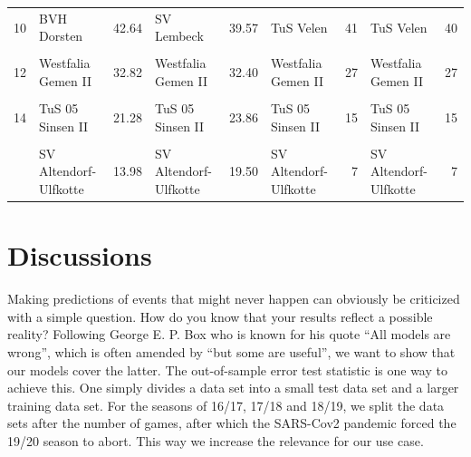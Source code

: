 \documentclass[12pt,a4paper]{article}
\begin{document}
\begin{table}[H]
{\begin{tabular}[t]{rlrlrlrlr}
10 & BVH Dorsten & 42.64 & SV Lembeck & 39.57 & TuS Velen & 41 & TuS Velen & 40\\
\addlinespace
\cellcolor{gray!6}{11} & \cellcolor{gray!6}{FC RW Dorsten} & \cellcolor{gray!6}{37.59} & \cellcolor{gray!6}{FC RW Dorsten} & \cellcolor{gray!6}{35.82} & \cellcolor{gray!6}{FC RW Dorsten} & \cellcolor{gray!6}{28} & \cellcolor{gray!6}{FC RW Dorsten} & \cellcolor{gray!6}{28}\\
12 & Westfalia Gemen II & 32.82 & Westfalia Gemen II & 32.40 & Westfalia Gemen II & 27 & Westfalia Gemen II & 27\\
\cellcolor{gray!6}{13} & \cellcolor{gray!6}{SC Reken II} & \cellcolor{gray!6}{27.60} & \cellcolor{gray!6}{SC Reken II} & \cellcolor{gray!6}{29.11} & \cellcolor{gray!6}{SC Reken II} & \cellcolor{gray!6}{25} & \cellcolor{gray!6}{SC Reken II} & \cellcolor{gray!6}{25}\\
14 & TuS 05 Sinsen II & 21.28 & TuS 05 Sinsen II & 23.86 & TuS 05 Sinsen II & 15 & TuS 05 Sinsen II & 15\\
\cellcolor{gray!6}{15} & \cellcolor{gray!6}{Adler Weseke II} & \cellcolor{gray!6}{18.88} & \cellcolor{gray!6}{Adler Weseke II} & \cellcolor{gray!6}{22.60} & \cellcolor{gray!6}{Adler Weseke II} & \cellcolor{gray!6}{15} & \cellcolor{gray!6}{Adler Weseke II} & \cellcolor{gray!6}{15}\\
\addlinespace
16 & SV Altendorf-Ulfkotte & 13.98 & SV Altendorf-Ulfkotte & 19.50 & SV Altendorf-Ulfkotte & 7 & SV Altendorf-Ulfkotte & 7\\
\bottomrule
\end{tabular}}
\end{table}

\hypertarget{discussions}{%
\section{Discussions}\label{discussions}}

Making predictions of events that might never happen can obviously be
criticized with a simple question. How do you know that your results
reflect a possible reality? Following George E. P. Box who is known for
his quote \enquote{All models are wrong}, which is often amended by
\enquote{but some are useful}, we want to show that our models cover the
latter. The out-of-sample error test statistic is one way to achieve
this. One simply divides a data set into a small test data set and a
larger training data set. For the seasons of 16/17, 17/18 and 18/19, we
split the data sets after the number of games, after which the SARS-Cov2
pandemic forced the 19/20 season to abort. This way we increase the
relevance for our use case.
\end{document}
